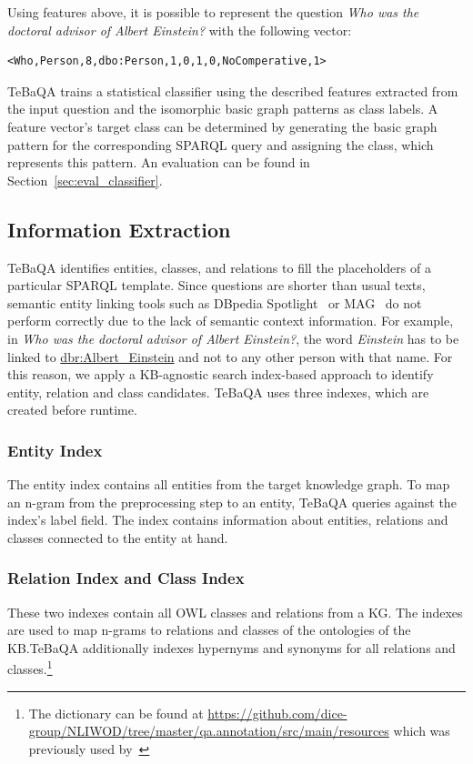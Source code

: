 \documentclass{IOS-Book-Article}
\begin{document}
Using features above, it is possible to represent the question \textit{Who was the doctoral advisor of Albert Einstein?} with the following vector:
\begin{lstlisting}[captionpos=b, basicstyle=\ttfamily,frame=single,basicstyle=\small]
<Who,Person,8,dbo:Person,1,0,1,0,NoComperative,1>
\end{lstlisting}

TeBaQA trains a statistical classifier using the described features extracted from the input question and the isomorphic basic graph patterns as class labels.
A feature vector's target class can be determined by generating the basic graph pattern for the corresponding SPARQL query and assigning the class, which represents this pattern.
An evaluation can be found in Section~\ref{sec:eval_classifier}.

\subsection{Information Extraction}
TeBaQA identifies entities, classes, and relations to fill the placeholders of a particular SPARQL template. 
Since questions are shorter than usual texts, semantic entity linking tools such as DBpedia Spotlight~\cite{isem2013daiber} or MAG~\cite{moussallem2017mag,MAG} do not perform correctly due to the lack of semantic context information. %
For example, in \textit{Who was the doctoral advisor of Albert Einstein?}, the word \textit{Einstein} has to be linked to \url{dbr:Albert_Einstein} and not to any other person with that name. 
For this reason, we apply a KB-agnostic search index-based approach to identify entity, relation and class candidates.  TeBaQA uses three indexes, which are created before runtime.
\subsubsection{Entity Index} The entity index contains all entities from the target knowledge graph. To map an n-gram from the preprocessing step to an entity, TeBaQA queries against the index's label field. The index contains information about entities, relations and classes connected to the entity at hand. 
\subsubsection{Relation Index and Class Index}
These two indexes contain all OWL classes and relations from a KG. The indexes are used to map n-grams to relations and classes of the ontologies of the KB.TeBaQA additionally indexes hypernyms and synonyms for all relations and classes.\footnote{The dictionary can be found at \url{https://github.com/dice-group/NLIWOD/tree/master/qa.annotation/src/main/resources} which was previously used by~\cite{DBLP:conf/esws/SinghBRS18}}
\end{document}
